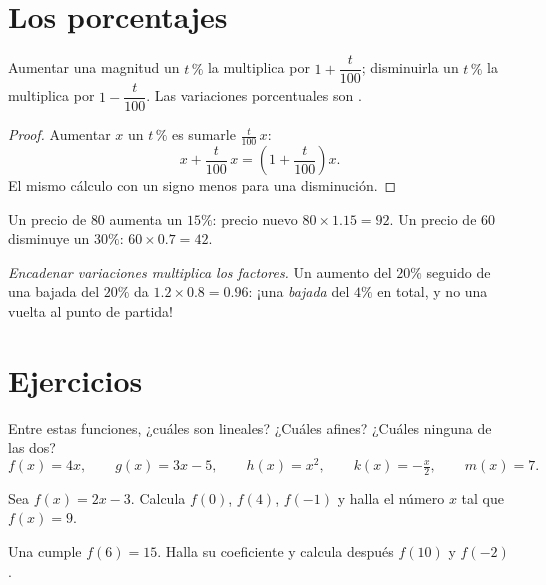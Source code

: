 \section{Los porcentajes}

\begin{proposition}\label{prop:g9:linfunc:percent}
Aumentar una magnitud un $t\,\%$ la multiplica por
$1 + \dfrac{t}{100}$; disminuirla un $t\,\%$ la multiplica por
$1 - \dfrac{t}{100}$. Las variaciones porcentuales son .
\end{proposition}

\begin{proof}
Aumentar $x$ un $t\,\%$ es sumarle $\frac{t}{100}\,x$:
\[
x + \frac{t}{100}\,x = \left(1 + \frac{t}{100}\right) x .
\]
El mismo cálculo con un signo menos para una disminución.
\end{proof}

\begin{example}\label{ex:g9:linfunc:percent}
Un precio de $80$ aumenta un $15\%$: precio nuevo
$80 \times 1.15 = 92$. Un precio de $60$ disminuye un $30\%$:
$60 \times 0.7 = 42$.

\emph{Encadenar variaciones multiplica los factores.} Un aumento del $20\%$
seguido de una bajada del $20\%$ da
$1.2 \times 0.8 = 0.96$: ¡una \emph{bajada} del $4\%$ en total, y no una vuelta
al punto de partida!
\end{example}

\section{Ejercicios}

\begin{exercise}[$\star$]\label{exo:g9:linfunc:1}
Entre estas funciones, ¿cuáles son lineales? ¿Cuáles afines? ¿Cuáles ninguna de las dos?
\[
f(x) = 4x, \qquad
g(x) = 3x - 5, \qquad
h(x) = x^2, \qquad
k(x) = -\tfrac x2, \qquad
m(x) = 7 .
\]
\end{exercise}

\begin{exercise}[$\star$]\label{exo:g9:linfunc:2}
Sea $f(x) = 2x - 3$. Calcula $f(0)$, $f(4)$, $f(-1)$ y halla el número
$x$ tal que $f(x) = 9$.
\end{exercise}

\begin{exercise}[$\star$]\label{exo:g9:linfunc:3}
Una  cumple $f(6) = 15$. Halla su coeficiente y calcula después
$f(10)$ y $f(-2)$.
\end{exercise}

